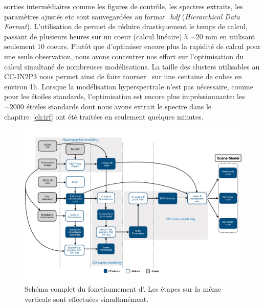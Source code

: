 \documentclass[../main/main.tex]{subfiles}
\begin{document}
sorties intermédiaires comme les figures de contrôle, les spectres
extraits, les paramètres ajustés etc sont sauvegardées au format
\textit{.hdf} (\textit{Hierarchical Data Format}). L'utilisation de
 permet de réduire drastiquement le temps de calcul, passant
de plusieurs heures sur un coeur (calcul linéaire) à $\sim20$
min en utilisant seulement $10$ coeurs. Plutôt que d'optimiser encore
plus la rapidité de calcul pour une seule observation, nous avons
concentrer nos effort sur l'optimisation du calcul simultané de
nombreuses modélisations. La taille des clusters utilisables au CC-IN2P3
nous permet ainsi de faire tourner \hypergal\ sur une centaine de cubes
en environ 1h. Lorsque la modélisation hyperspectrale n'est pas
nécessaire, comme pour les étoiles standards, l'optimisation est encore
plus impréssionnante: les $\sim2000$ étoiles standards dont nous avons
extrait le spectre dans le chapitre~\ref{ch:irf} ont été traitées en
seulement quelques minutes.

\begin{landscape}
\begin{figure}
  \centering
  \includegraphics[width=0.99\linewidth]{../figures/07_scene/Fulldaghypergal.pdf}
  \caption{Schéma complet du fonctionnement d'\hypergal. Les étapes sur
    la même verticale sont effectuées simultanément.}
  \label{fig:fulldag}
\end{figure}
\end{landscape}
\end{document}
